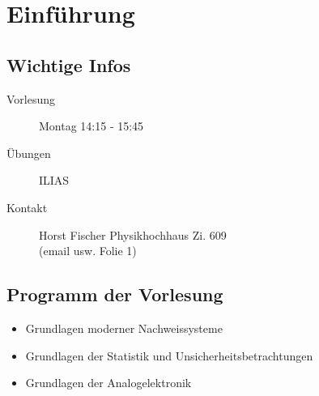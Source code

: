 \setcounter{chapter}{-1}

\chapter{Einführung}

\section{Wichtige Infos}

\begin{description}
	\item[Vorlesung] Montag 14:15 - 15:45
	\item[Übungen] ILIAS
	\item[Kontakt] Horst Fischer Physikhochhaus Zi. 609\\
	\hfw (email usw. Folie 1)
\end{description}

\section{Programm der Vorlesung}

\begin{itemize}
	\item Grundlagen moderner Nachweissysteme
	\item Grundlagen der Statistik und Unsicherheitsbetrachtungen
	\item Grundlagen der Analogelektronik
\end{itemize}